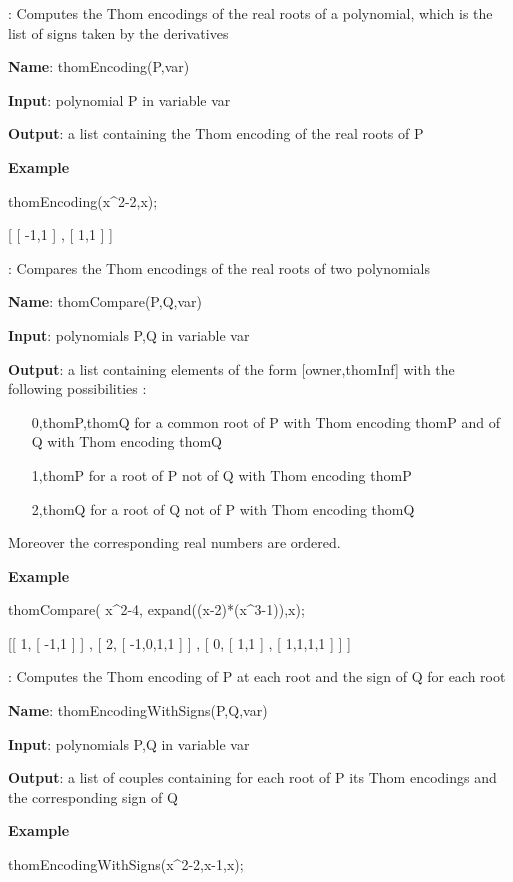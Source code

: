 \documentclass{article}
\begin{document}
:
  Computes the Thom encodings of the real roots of a polynomial, which is the
  list of signs taken by the derivatives
  
{\bf Name}: thomEncoding(P,var)
  
{\bf   Input}: polynomial P in variable var
  
{\bf   Output}: a list containing the Thom encoding of the real roots of P
  
{\bf Example}
  
  thomEncoding(x\^{}2-2,x);
  
    [ [ -1,1 ] , [ 1,1 ] ]
    

:
  Compares the Thom encodings of the real roots of two polynomials
  
{\bf Name}: thomCompare(P,Q,var)
  
{\bf Input}: polynomials P,Q in variable var
  
{\bf Output}: a list containing elements of the form [owner,thomInf] with the
  following possibilities :
  \begin{itemize}
    \item [0,thomP,thomQ] for a common root of P with Thom encoding thomP and
    of Q with Thom encoding thomQ
    \item [1,thomP] for a root of P not of Q with Thom encoding thomP
    \item [2,thomQ] for a root of Q not of P with Thom encoding thomQ
  \end{itemize}
  Moreover the corresponding real numbers are ordered.
  
{\bf Example}

  thomCompare( x\^{}2-4, expand((x-2)*(x\^{}3-1)),x);
  
  [[ 1, [ -1,1 ] ] , [ 2, [ -1,0,1,1 ] ] , [ 0, [ 1,1 ] , [ 1,1,1,1 ] ] ]
 
  

:
  Computes the Thom encoding of P at each root and the sign of Q for each root
  
{\bf Name}: thomEncodingWithSigns(P,Q,var)
  
{\bf Input}: polynomials P,Q in variable var
  
{\bf Output}: a list of couples containing for each root of P its Thom encodings
  and the corresponding sign of Q
  
{\bf Example}

thomEncodingWithSigns(x\^{}2-2,x-1,x);
\end{document}
